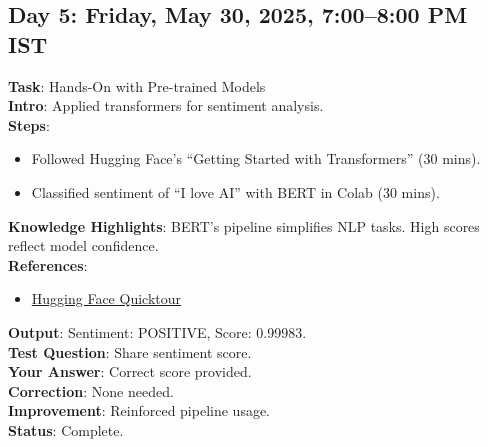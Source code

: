 \documentclass[a4paper,12pt]{article}
\begin{document}
\subsection*{Day 5: Friday, May 30, 2025, 7:00--8:00 PM IST}
\textbf{Task}: Hands-On with Pre-trained Models \\
\textbf{Intro}: Applied transformers for sentiment analysis. \\
\textbf{Steps}:
\begin{itemize}
    \item Followed Hugging Face’s ``Getting Started with Transformers'' (30 mins).
    \item Classified sentiment of ``I love AI'' with BERT in Colab (30 mins).
\end{itemize}
\textbf{Knowledge Highlights}: BERT’s pipeline simplifies NLP tasks. High scores reflect model confidence. \\
\textbf{References}: 
\begin{itemize}
    \item \href{https://huggingface.co/docs/transformers/quicktour}{Hugging Face Quicktour}
\end{itemize}
\textbf{Output}: Sentiment: POSITIVE, Score: 0.99983. \\
\textbf{Test Question}: Share sentiment score. \\
\textbf{Your Answer}: Correct score provided. \\
\textbf{Correction}: None needed. \\
\textbf{Improvement}: Reinforced pipeline usage. \\
\textbf{Status}: Complete.

\end{document}
